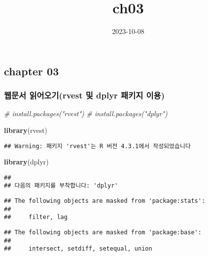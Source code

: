\documentclass[
]{article}
\title{ch03}
\author{}
\date{\vspace{-2.5em}2023-10-08}
\newenvironment{Shaded}{\begin{snugshade}}{\end{snugshade}}
\newcommand{\CommentTok}[1]{\textcolor[rgb]{0.56,0.35,0.01}{\textit{#1}}}
\newcommand{\FunctionTok}[1]{\textcolor[rgb]{0.13,0.29,0.53}{\textbf{#1}}}
\newcommand{\NormalTok}[1]{#1}
\begin{document}
\maketitle

\hypertarget{chapter-03}{%
\subsection{chapter 03}\label{chapter-03}}

\hypertarget{uxc6f9uxbb38uxc11c-uxc77duxc5b4uxc624uxae30rvest-uxbc0f-dplyr-uxd328uxd0a4uxc9c0-uxc774uxc6a9}{%
\subsubsection{웹문서 읽어오기(rvest 및 dplyr 패키지
이용)}\label{uxc6f9uxbb38uxc11c-uxc77duxc5b4uxc624uxae30rvest-uxbc0f-dplyr-uxd328uxd0a4uxc9c0-uxc774uxc6a9}}

\begin{Shaded}
\begin{Highlighting}[]
\CommentTok{\# install.packages("rvest")}
\CommentTok{\# install.packages("dplyr")}

\FunctionTok{library}\NormalTok{(rvest)}
\end{Highlighting}
\end{Shaded}

\begin{verbatim}
## Warning: 패키지 'rvest'는 R 버전 4.3.1에서 작성되었습니다
\end{verbatim}

\begin{Shaded}
\begin{Highlighting}[]
\FunctionTok{library}\NormalTok{(dplyr)}
\end{Highlighting}
\end{Shaded}

\begin{verbatim}
## 
## 다음의 패키지를 부착합니다: 'dplyr'
\end{verbatim}

\begin{verbatim}
## The following objects are masked from 'package:stats':
## 
##     filter, lag
\end{verbatim}

\begin{verbatim}
## The following objects are masked from 'package:base':
## 
##     intersect, setdiff, setequal, union
\end{verbatim}
\end{document}
